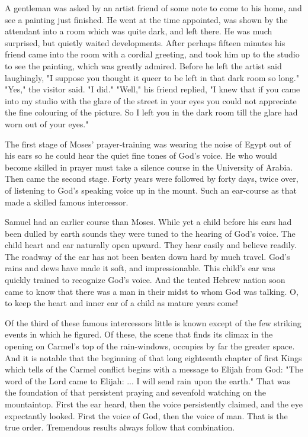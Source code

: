A gentleman was asked by an artist friend of some note to come to his
home, and see a painting just finished. He went at the time appointed, was
shown by the attendant into a room which was quite dark, and left there.
He was much surprised, but quietly waited developments. After perhaps
fifteen minutes his friend came into the room with a cordial greeting, and
took him up to the studio to see the painting, which was greatly admired.
Before he left the artist said laughingly, "I suppose you thought it queer
to be left in that dark room so long." "Yes," the visitor said. "I did."
"Well," his friend replied, "I knew that if you came into my studio with
the glare of the street in your eyes you could not appreciate the fine
colouring of the picture. So I left you in the dark room till the glare
had worn out of your eyes."

The first stage of Moses' prayer-training was wearing the noise of Egypt
out of his ears so he could hear the quiet fine tones of God's voice. He
who would become skilled in prayer must take a silence course in the
University of Arabia. Then came the second stage. Forty years were
followed by forty days, twice over, of listening to God's speaking voice
up in the mount. Such an ear-course as that made a skilled famous
intercessor.

Samuel had an earlier course than Moses. While yet a child before his ears
had been dulled by earth sounds they were tuned to the hearing of God's
voice. The child heart and ear naturally open upward. They hear easily and
believe readily. The roadway of the ear has not been beaten down hard by
much travel. God's rains and dews have made it soft, and impressionable.
This child's ear was quickly trained to recognize God's voice. And the
tented Hebrew nation soon came to know that there was a man in their midst
to whom God was talking. O, to keep the heart and inner ear of a child as
mature years come!

Of the third of these famous intercessors little is known except of the
few striking events in which he figured. Of these, the scene that finds
its climax in the opening on Carmel's top of the rain-windows, occupies by
far the greater space. And it is notable that the beginning of that long
eighteenth chapter of first Kings which tells of the Carmel conflict
begins with a message to Elijah from God: "The word of the Lord came to
Elijah: ... I will send rain upon the earth." That was the foundation of
that persistent praying and sevenfold watching on the mountaintop. First
the ear heard, then the voice persistently claimed, and the eye
expectantly looked. First the voice of God, then the voice of man. That is
the true order. Tremendous results always follow that combination.



